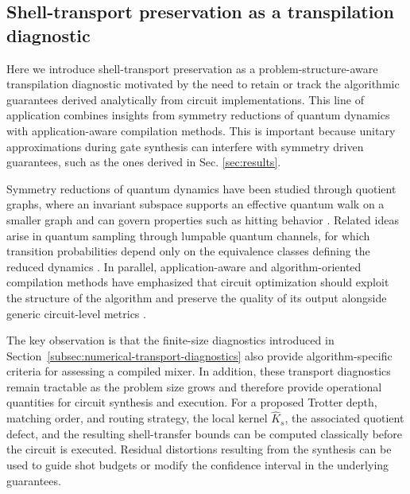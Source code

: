 \documentclass[a4paper,onecolumn,11pt,unpublished]{quantumarticle}
\theoremstyle{remark}
\begin{document}
\subsection{Shell-transport preservation as a transpilation diagnostic}
\label{subsec:shell-transport-transpilation}

Here we introduce shell-transport preservation as a problem-structure-aware
transpilation diagnostic motivated by the need to retain or track the algorithmic guarantees derived analytically from circuit implementations. This line of application combines insights from symmetry reductions of quantum dynamics with application-aware compilation methods. This is important because unitary approximations during gate synthesis can interfere with symmetry driven guarantees, such as the ones derived in Sec. \ref{sec:results}. 

Symmetry reductions of quantum dynamics have been studied through quotient graphs, where an invariant subspace supports an effective quantum walk on a smaller graph and can govern properties such as hitting behavior
\cite{KroviBrun2007Quotient}. Related ideas arise in quantum sampling through
lumpable quantum channels, for which transition probabilities depend only on
the equivalence classes defining the reduced dynamics
\cite{Franca2018PerfectSampling}. In parallel, application-aware and
algorithm-oriented compilation methods have emphasized that circuit
optimization should exploit the structure of the algorithm and preserve the
quality of its output alongside generic circuit-level metrics
\cite{Quetschlich2024ApplicationAware,Ji2025AOQMAP,Zhu2024Coqa}.

The key observation is that the finite-size diagnostics introduced in
Section~\ref{subsec:numerical-transport-diagnostics} also provide
algorithm-specific criteria for assessing a compiled mixer. In addition, these transport diagnostics remain tractable as the problem size grows and therefore provide operational quantities for circuit synthesis and execution. For a proposed Trotter depth, matching order, and routing strategy, the local kernel
\(\widehat K_s\), the associated quotient defect, and the resulting
shell-transfer bounds can be computed classically before the circuit is
executed. Residual distortions resulting from the synthesis can be used to guide shot budgets or modify the confidence interval in the underlying guarantees.
\end{document}
